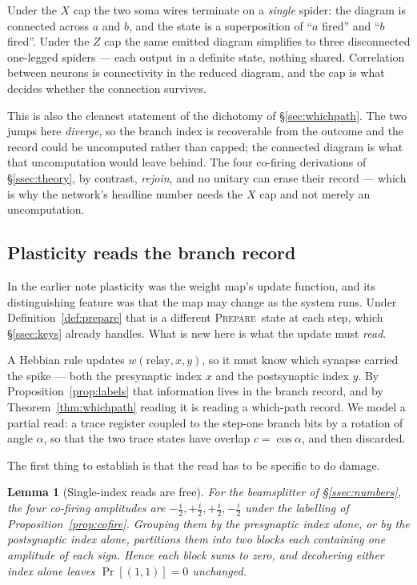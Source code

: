 \documentclass[11pt]{article}
\theoremstyle{definition}
\theoremstyle{plain}
\newtheorem{lemma}[definition]{Lemma}
\newcommand{\PREP}{\textsc{Prepare}}
\begin{document}
Under the $X$ cap the two soma wires terminate on a \emph{single} spider: the
diagram is connected across $a$ and $b$, and the state is a superposition of
``$a$ fired'' and ``$b$ fired''. Under the $Z$ cap the same emitted diagram
simplifies to three disconnected one-legged spiders --- each output in a
definite state, nothing shared. Correlation between neurons is connectivity in
the reduced diagram, and the cap is what decides whether the connection
survives.

This is also the cleanest statement of the dichotomy of \S\ref{sec:whichpath}.
The two jumps here \emph{diverge}, so the branch index is recoverable from the
outcome and the record could be uncomputed rather than capped; the connected
diagram is what that uncomputation would leave behind. The four co-firing
derivations of \S\ref{ssec:theory}, by contrast, \emph{rejoin}, and no unitary
can erase their record --- which is why the network's headline number needs the
$X$ cap and not merely an uncomputation.

\subsection{Plasticity reads the branch record}\label{ssec:plasticity}

In the earlier note plasticity was the weight map's update function, and its
distinguishing feature was that the map may change as the system runs. Under
Definition~\ref{def:prepare} that is a different \PREP\ state at each step,
which \S\ref{ssec:keys} already handles. What is new here is what the update
must \emph{read}.

A Hebbian rule updates $w(\mathrm{relay},x,y)$, so it must know which synapse
carried the spike --- both the presynaptic index $x$ and the postsynaptic index
$y$. By Proposition~\ref{prop:labels} that information lives in the branch
record, and by Theorem~\ref{thm:whichpath} reading it is reading a which-path
record. We model a partial read: a trace register coupled to the step-one
branch bits by a rotation of angle $\alpha$, so that the two trace states have
overlap $c = \cos\alpha$, and then discarded.

The first thing to establish is that the read has to be specific to do damage.

\begin{lemma}[Single-index reads are free]\label{lem:coarse}
For the beamsplitter of \S\ref{ssec:numbers}, the four co-firing amplitudes are
$-\tfrac{i}{2}, +\tfrac{i}{2}, +\tfrac{i}{2}, -\tfrac{i}{2}$ under the labelling
of Proposition~\ref{prop:cofire}. Grouping them by the presynaptic index alone,
or by the postsynaptic index alone, partitions them into two blocks each
containing one amplitude of each sign. Hence each block sums to zero, and
decohering either index alone leaves $\Pr[(1,1)] = 0$ unchanged.
\end{lemma}
\end{document}
